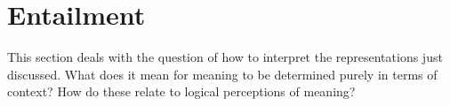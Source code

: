 \documentclass[12pt]{report}
\newcommand{\Cont}{\mathrm{Cont}}
\begin{document}



\section{Entailment}

This section deals with the question of how to interpret the representations just discussed. What does it mean for meaning to be determined purely in terms of context? How do these relate to logical perceptions of meaning?
\end{document}
